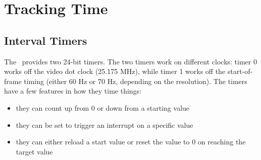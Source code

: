 \chapter{Tracking Time}

\section*{Interval Timers}

The \jr\ provides two 24-bit timers. The two timers work on different clocks: timer 0 works off the video dot clock (25.175 MHz), while timer 1 works off the start-of-frame timing (either 60 Hz or 70 Hz, depending on the resolution). The timers have a few features in how they time things:

\begin{itemize}
    \item they can count up from 0 or down from a starting value

    \item they can be set to trigger an interrupt on a specific value

    \item they can either reload a start value or reset the value to 0 on reaching the target value
\end{itemize}

